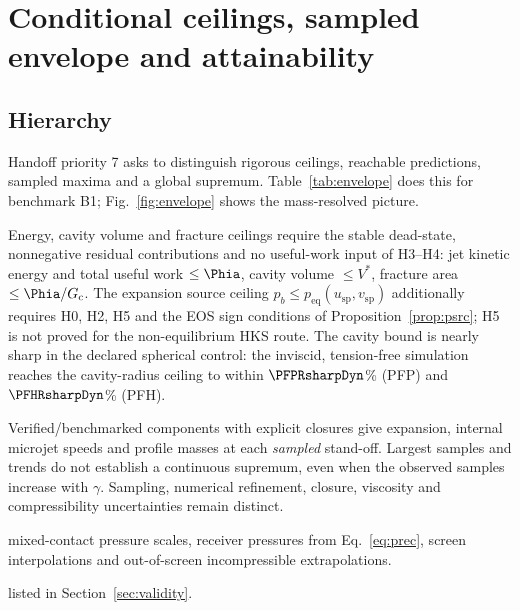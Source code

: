 \section{Conditional ceilings, sampled envelope and attainability}\label{sec:envelope}
\subsection{Hierarchy}
Handoff priority 7 asks to distinguish rigorous ceilings, reachable predictions, sampled maxima and a global
supremum. Table~\ref{tab:envelope} does this for benchmark B1; Fig.~\ref{fig:envelope} shows the mass-resolved
picture.
\begin{description}[leftmargin=0.6cm]
\item[R --- rigorous conditional ceilings] Energy, cavity volume and fracture ceilings require the
stable dead-state, nonnegative residual contributions and no useful-work input of H3--H4:
jet kinetic energy and total useful work $\le\Phia$, cavity volume $\le V^*$, fracture area
$\le\Phia/G_{\mathrm c}$. The expansion source ceiling
$p_b\le p_{\mathrm{eq}}(u_{\mathrm{sp}},v_{\mathrm{sp}})$ additionally requires H0, H2, H5 and the
EOS sign conditions of Proposition~\ref{prop:psrc}; H5 is not proved for the non-equilibrium HKS route.
The cavity bound is nearly sharp in the declared spherical control: the inviscid, tension-free
simulation reaches the cavity-radius ceiling to within $\PFPRsharpDyn$\% (PFP) and $\PFHRsharpDyn$\% (PFH).
\item[P --- reduced-model predictions] Verified/benchmarked components with explicit closures give expansion,
internal microjet speeds and profile masses at each \emph{sampled} stand-off. Largest samples and trends
do not establish a continuous supremum, even when the observed samples increase with $\gamma$.
Sampling, numerical refinement, closure, viscosity and compressibility uncertainties remain distinct.
\item[E --- estimates] mixed-contact pressure scales, receiver pressures from Eq.~\eqref{eq:prec},
screen interpolations and out-of-screen incompressible extrapolations.
\item[U --- unresolved] listed in Section~\ref{sec:validity}.
\end{description}



